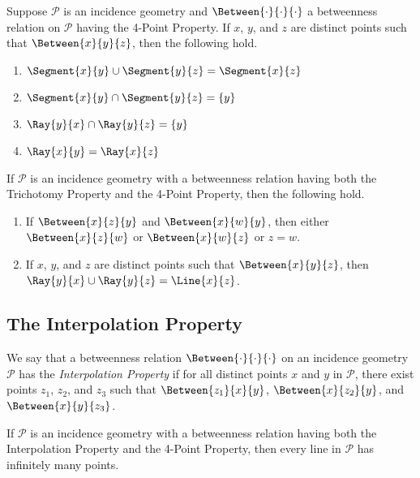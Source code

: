 \documentclass{article}
\begin{document}
\begin{prop}
Suppose $\mathcal{P}$ is an incidence geometry and $\Between{\cdot}{\cdot}{\cdot}$ a betweenness relation on $\mathcal{P}$ having the 4-Point Property. If $x$, $y$, and $z$ are distinct points such that $\Between{x}{y}{z}$, then the following hold.
\begin{enumerate}
\item $\Segment{x}{y} \cup \Segment{y}{z} = \Segment{x}{z}$
\item $\Segment{x}{y} \cap \Segment{y}{z} = \{y\}$
\item $\Ray{y}{x} \cap \Ray{y}{z} = \{y\}$
\item $\Ray{x}{y} = \Ray{x}{z}$
\end{enumerate}
\end{prop}

\begin{prop}
If $\mathcal{P}$ is an incidence geometry with a betweenness relation having both the Trichotomy Property and the 4-Point Property, then the following hold.
\begin{enumerate}
\item If $\Between{x}{z}{y}$ and $\Between{x}{w}{y}$, then either $\Between{x}{z}{w}$ or $\Between{x}{w}{z}$ or $z = w$.
\item If $x$, $y$, and $z$ are distinct points such that $\Between{x}{y}{z}$, then $\Ray{y}{x} \cup \Ray{y}{z} = \Line{x}{z}$.
\end{enumerate}
\end{prop}



\subsection*{The Interpolation Property}

\begin{dfn}
We say that a betweenness relation $\Between{\cdot}{\cdot}{\cdot}$ on an incidence geometry $\mathcal{P}$ has the \emph{Interpolation Property} if for all distinct points $x$ and $y$ in $\mathcal{P}$, there exist points $z_1$, $z_2$, and $z_3$ such that $\Between{z_1}{x}{y}$, $\Between{x}{z_2}{y}$, and $\Between{x}{y}{z_3}$.
\end{dfn}

\begin{prop}
If $\mathcal{P}$ is an incidence geometry with a betweenness relation having both the Interpolation Property and the 4-Point Property, then every line in $\mathcal{P}$ has infinitely many points.
\end{prop}
\end{document}
